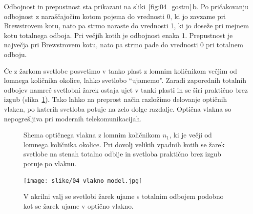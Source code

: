 Odbojnost in prepustnost sta prikazani na sliki~\ref{fig:04_gostm}\,b. Po pričakovanju 
odbojnost z naraščajočim kotom pojema do vrednosti 0, ki jo zavzame pri Brewstrovem kotu, 
nato pa strmo naraste do vrednosti 1, ki jo doseže pri mejnem kotu totalnega odboja. Pri večjih
kotih je odbojnost enaka 1. Prepustnost je največja pri Brewstrovem kotu, nato pa strmo
pade do vrednosti 0 pri totalnem odboju.

\begin{remark}
Če z žarkom svetlobe posvetimo v tanko plast z lomnim količnikom večjim od 
lomnega količnika okolice, lahko svetlobo ``ujamemo''. Zaradi
zaporednih totalnih odbojev namreč svetlobni žarek ostaja ujet v tanki plasti in se 
širi praktično brez izgub (slika~\ref{fig:04_vlakno}). Tako lahko na 
preprost način razložimo delovanje optičnih vlaken,
po katerih svetloba potuje na zelo dolge razdalje. Optična vlakna so nepogrešljiva
pri modernih telekomunikacijah.
\begin{figure}[ht]
\centering
\def\svgwidth{130truemm} 

\caption{Shema optičnega vlakna z lomnim količnikom $n_1$, ki je večji od lomnega količnika
okolice. Pri dovolj velikih vpadnih kotih se žarek svetlobe na stenah totalno odbije in svetloba
praktično brez izgub potuje po vlaknu.}
\label{fig:04_vlakno}
\end{figure}

\begin{figure}[ht]
\centering
\texttt{[image: slike/04\_vlakno\_model.jpg]}
\caption{V akrilni valj se svetlobi žarek ujame s totalnim odbojem podobno kot se žarek
ujame v optično vlakno.}
\label{fig:04_vlaknomodel}
\end{figure}
\end{remark}

